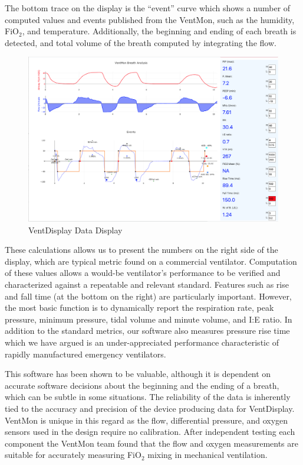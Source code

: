 \documentclass[11pt, letterpaper]{article}
\begin{document}
The bottom trace on the display is the ``event'' curve which shows a number of computed values and events published from the VentMon, such as the humidity, FiO$_2$, and temperature. Additionally, the beginning and ending of each breath is detected, and total volume of the breath computed by integrating the flow.


\begin{figure}[H]
\centering
\includegraphics[width=\textwidth]{images/VentDisplayExample.png}
\caption{VentDisplay Data Display}
\label{fig:ventdisplay}
\end{figure}

These calculations allows us to present the numbers on the right side of the display, which are typical metric found on a commercial ventilator. Computation of these values allows a would-be ventilator's performance to be verified and characterized against a repeatable and relevant standard. Features such as rise and fall time (at the bottom on the right) are particularly important. However, the most basic function is to dynamically report the respiration rate, peak pressure, minimum pressure, tidal volume and minute volume, and I:E ratio. In addition to the standard metrics, our software also measures pressure rise time which we have argued is an under-appreciated performance characteristic of rapidly manufactured emergency ventilators\cite{schulz2020importance}.

This software has been shown to be valuable, although it is dependent on accurate software decisions about
the beginning and the ending of a breath, which can be subtle in some situations. The reliability of the data is inherently tied to the accuracy and precision of the device producing data for VentDisplay. VentMon is unique in this regard as the flow, differential pressure, and oxygen sensors used in the design require no calibration. After independent testing each component the VentMon team found that the flow and oxygen measurements are suitable for accurately measuring FiO$_2$ mixing in mechanical ventilation.
\end{document}

